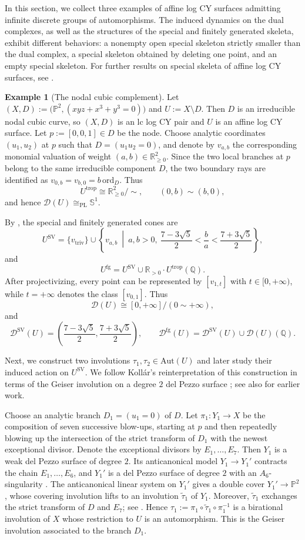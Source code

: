 \documentclass[reqno, 12pt]{amsart}
\theoremstyle{definition}
\newtheorem{expl}[prop]{Example}
\newcommand{\bP}{\mathbb{P}}
\newcommand{\bR}{\mathbb{R}}
\newcommand{\bQ}{\mathbb{Q}}
\newcommand{\bS}{\mathbb{S}}
\newcommand{\cD}{\mathcal{D}}
\newcommand{\Aut}{\mathrm{Aut}}
\newcommand{\ord}{\mathrm{ord}}
\newcommand{\trop}{\mathrm{trop}}
\newcommand{\triv}{\mathrm{triv}}
\newcommand{\SV}{\mathrm{SV}}
\newcommand{\rfg}{\mathrm{fg}}
\newcommand{\PL}{\mathrm{PL}}
\numberwithin{equation}{section}
\begin{document}
In this section, we collect three examples of affine log CY surfaces admitting
infinite discrete groups of automorphisms. The induced dynamics on the dual
complexes, as well as the structures of the special and finitely generated
skeleta, exhibit different behaviors: a nonempty open special skeleton
strictly smaller than the dual complex, a special skeleton obtained by deleting
one point, and an empty special skeleton. For further results on  special skeleta of affine log CY surfaces, see \cite{Pen25}.

\begin{expl}[The nodal cubic complement]\label{ex:nodal-cubic}
Let $(X,D):=\bigl(\bP^2,(xyz+x^3+y^3=0)\bigr)$ and $U:=X\setminus D$.
Then $D$ is an irreducible nodal cubic curve, so $(X,D)$ is an lc log CY pair
and $U$ is an affine log CY surface. Let $p:=[0,0,1]\in D$ be the node. Choose
analytic coordinates $(u_1,u_2)$ at $p$ such that $D=(u_1 u_2=0)$, and denote by
$v_{a,b}$ the corresponding monomial valuation of weight
$(a,b)\in\bR_{\geq0}^2$. Since the two local branches at $p$ belong to
the same irreducible component $D$, the two boundary rays are identified as $
v_{0,b}=v_{b,0}=b\,\ord_D$.
Thus
\[
U^{\trop}\cong
\bR_{\geq0}^2/\sim, \qquad (0,b)\sim (b,0),
\]
and hence $\cD(U)\cong_{\PL}\bS^1$.

By \cite[Section~6]{LXZ22}, the special and finitely generated cones are
\[
U^{\SV}
=
\{v_{\triv}\}\cup
\left\{
v_{a,b}\ \middle|\ a,b>0,\ 
\frac{7-3\sqrt5}{2}<\frac{b}{a}<
\frac{7+3\sqrt5}{2}
\right\},
\]
and
\[
U^{\rfg}
=
U^{\SV}\cup \bR_{>0} \cdot U^{\trop}(\bQ).
\]
After projectivizing, every point can be represented by $[v_{1,t}]$ with
$t\in [0,+\infty)$, while $t=+\infty$ denotes the class $[v_{0,1}]$.
Thus
\[
\cD(U)\cong [0,+\infty]/(0\sim+\infty),
\]
and
\[
\cD^{\SV}(U)
=
\left(
\frac{7-3\sqrt5}{2},
\frac{7+3\sqrt5}{2}
\right),
\qquad
\cD^{\rfg}(U)
=
\cD^{\SV}(U)\cup \cD(U)(\bQ).
\]

Next, we construct two involutions $\tau_1,\tau_2\in\Aut(U)$ and later study
their induced action on $U^{\SV}$. We follow Koll\'ar's reinterpretation of
this construction in terms of the Geiser involution on a degree $2$ del
Pezzo surface \cite[Paragraphs~21--23]{Kol24}; see also
\cite{Yos85,Ore02} for earlier work.

Choose an analytic branch $D_1=(u_1=0)$ of $D$.
Let $\pi_1:Y_1\to X$
be the composition of seven successive blow-ups, starting at $p$ and then
repeatedly blowing up the intersection of the strict transform of $D_1$
with the newest exceptional divisor. Denote the exceptional divisors by
$E_1,\ldots,E_7$. Then $Y_1$ is a weak del Pezzo surface of degree $2$.
Its anticanonical model $Y_1\to Y_1'$
contracts the chain $E_1,\ldots,E_6$, and $Y_1'$ is a del Pezzo surface
of degree $2$ with an $A_6$-singularity
\cite[Example~24]{Kol24}. The anticanonical linear system on $Y_1'$ gives  a double cover
$Y_1'\to\bP^2$, whose covering involution lifts to an involution $\widetilde\tau_1$ of $Y_1$. Moreover,
$\widetilde\tau_1$ exchanges the strict transform of $D$ and $E_7$;
see \cite[(23.4)--(23.5)]{Kol24}. Hence
$\tau_1:=\pi_1\circ\widetilde\tau_1\circ\pi_1^{-1}$
is a birational involution of $X$ whose restriction to $U$ is an
automorphism. This is the Geiser involution associated to the branch
$D_1$.


\end{expl}
\end{document}
